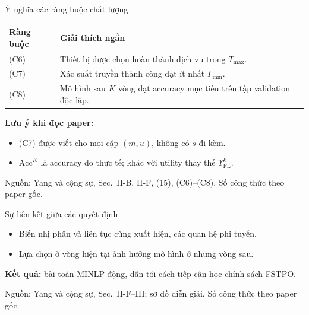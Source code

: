 \documentclass[10pt,aspectratio=43]{beamer}
\newcommand{\source}[1]{\par\vfill{\fontsize{5.8}{7}\selectfont\color{Muted}Nguồn: #1\par}}
\newcommand{\paperref}[1]{\source{Yang và cộng sự, Sec.~#1. Số công thức theo paper gốc.}}
\newcommand{\FL}{\mathrm{FL}}
\newcommand{\Acc}{\mathrm{Acc}}
\begin{document}
\begin{frame}[t]{Ý nghĩa các ràng buộc chất lượng}
\relax
\renewcommand{\arraystretch}{1.7}
\begin{tabularx}{\textwidth}{@{}>{\raggedright\arraybackslash}p{1.4cm}Y@{}}
\toprule
\textbf{Ràng buộc} & \textbf{Giải thích ngắn}\\
\midrule
(C6) & Thiết bị được chọn hoàn thành dịch vụ trong $T_{\max}$.\\
(C7) & Xác suất truyền thành công đạt ít nhất $\Gamma_{\min}$.\\
(C8) & Mô hình sau $K$ vòng đạt accuracy mục tiêu trên tập validation độc lập.\\
\bottomrule
\end{tabularx}
\par\bigskip
\textbf{Lưu ý khi đọc paper:}
\begin{itemize}
\item (C7) được viết cho mọi cặp $(m,u)$, không có $s$ đi kèm.
\item $\Acc^K$ là accuracy đo thực tế; khác với utility thay thế $\Upsilon_{\FL}^k$.
\end{itemize}
\paperref{II-B, II-F, (15), (C6)--(C8)}
\end{frame}

\begin{frame}[t]{Sự liên kết giữa các quyết định}
\relax
\centering
{}
\par\bigskip\raggedright
\begin{itemize}
\item Biến nhị phân và liên tục cùng xuất hiện, các quan hệ phi tuyến.
\item Lựa chọn ở vòng hiện tại ảnh hưởng mô hình ở những vòng sau.
\end{itemize}
\textbf{Kết quả:} bài toán MINLP động, dẫn tới cách tiếp cận học chính sách FSTPO.
\paperref{II-F--III; sơ đồ diễn giải}
\end{frame}
\end{document}
